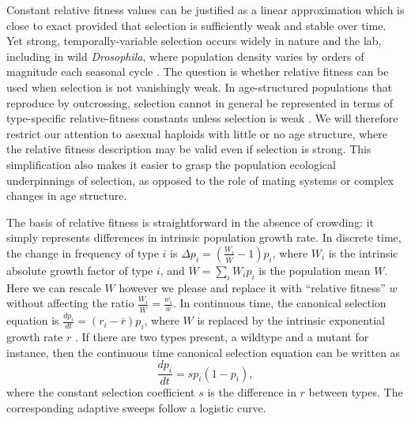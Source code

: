 \documentclass[12pt]{article}
\begin{document}
Constant relative fitness values can be justified as a linear approximation \cite[pp. 277]{ewens_2004} \citep[Chap. 4]{charlesworth_1994} which is close to exact provided that selection is sufficiently weak and stable over time. Yet strong, temporally-variable selection occurs widely in nature and the lab, including in wild \textit{Drosophila}, where population density varies by orders of magnitude each seasonal cycle \citep{messer_2016,bergland_14}. The question is whether relative fitness can be used when selection is not vanishingly weak. In age-structured populations that reproduce by outcrossing, selection cannot in general be represented in terms of type-specific relative-fitness constants unless selection is weak \citep[Chap. 4]{charlesworth_1994}. We will therefore restrict our attention to asexual haploids with little or no age structure, where the relative fitness description may be valid even if selection is strong. This simplification also makes it easier to grasp the population ecological underpinnings of selection, as opposed to the role of mating systems or complex changes in age structure.

The basis of relative fitness is straightforward in the absence of crowding: it simply represents differences in intrinsic population growth rate. In discrete time, the change in frequency of type $i$ is $\Delta p_i=\left(\frac{W_i}{\overline{W}}-1\right) p_i$, where $W_i$ is the intrinsic absolute growth factor of type $i$, and $\overline{W}=\sum_i W_i p_i$ is the population mean $W$. Here we can rescale $W$ however we please and replace it with ``relative fitness'' $w$ without affecting the ratio $\frac{W_i}{\overline{W}}=\frac{w_i}{\overline{w}}$. In continuous time, the canonical selection equation is $\frac{d p_i}{dt}=(r_i-\overline{r}) p_i$, where $W$ is replaced by the intrinsic exponential growth rate $r$ \citep[pp. 26]{crow_1970}. If there are two types present, a wildtype and a mutant for instance, then the continuous time canonical selection equation can be written as
\begin{equation}
\frac{d p_i}{dt}=s p_i(1-p_i), \label{eq:canonical}
\end{equation}
where the constant selection coefficient $s$ is the difference in $r$ between types. The corresponding adaptive sweeps follow a logistic curve. 
\end{document}
